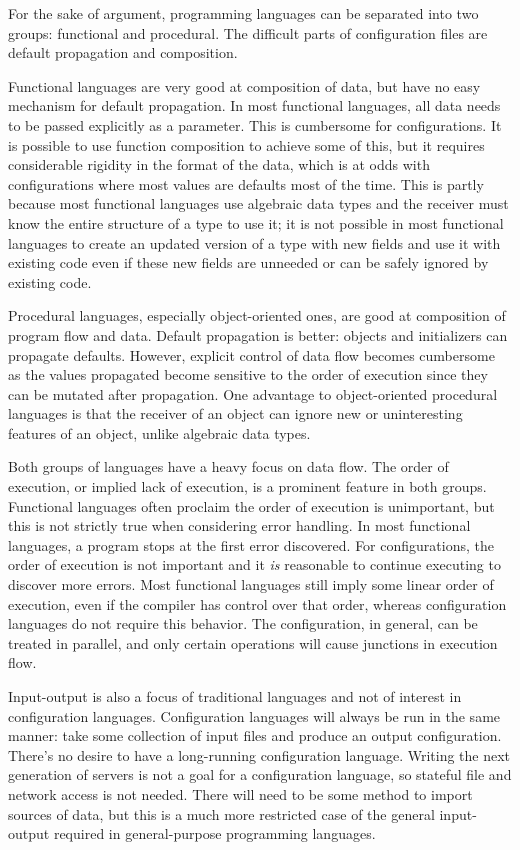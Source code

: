 \documentclass[letterpaper,twocolumn,10pt]{article}
\begin{document}
For the sake of argument, programming languages can be separated into two groups: functional and procedural. The difficult parts of configuration files are default propagation and composition.

Functional languages are very good at composition of data, but have no easy mechanism for default propagation. In most functional languages, all data needs to be passed explicitly as a parameter. This is cumbersome for configurations. It is possible to use function composition to achieve some of this, but it requires considerable rigidity in the format of the data, which is at odds with configurations where most values are defaults most of the time. This is partly because most functional languages use algebraic data types and the receiver must know the entire structure of a type to use it; it is not possible in most functional languages to create an updated version of a type with new fields and use it with existing code even if these new fields are unneeded or can be safely ignored by existing code.

Procedural languages, especially object-oriented ones, are good at composition of program flow and data. Default propagation is better: objects and initializers can propagate defaults. However, explicit control of data flow becomes cumbersome as the values propagated become sensitive to the order of execution since they can be mutated after propagation. One advantage to object-oriented procedural languages is that the receiver of an object can ignore new or uninteresting features of an object, unlike algebraic data types.

Both groups of languages have a heavy focus on data flow. The order of execution, or implied lack of execution, is a prominent feature in both groups. Functional languages often proclaim the order of execution is unimportant, but this is not strictly true when considering error handling. In most functional languages, a program stops at the first error discovered. For configurations, the order of execution is not important and it \emph{is} reasonable to continue executing to discover more errors. Most functional languages still imply some linear order of execution, even if the compiler has control over that order, whereas configuration languages do not require this behavior. The configuration, in general, can be treated in parallel, and only certain operations will cause junctions in execution flow.

Input-output is also a focus of traditional languages and not of interest in configuration languages. Configuration languages will always be run in the same manner: take some collection of input files and produce an output configuration. There's no desire to have a long-running configuration language. Writing the next generation of servers is not a goal for a configuration language, so stateful file and network access is not needed. There will need to be some method to import sources of data, but this is a much more restricted case of the general input-output required in general-purpose programming languages.
\end{document}
